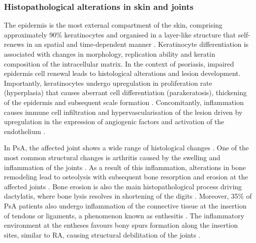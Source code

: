 \subsubsection*{Histopathological alterations in skin and joints}

The epidermis is the most external compartment of the skin, comprising approximately 90\% keratinocytes  and organised in a layer-like structure that self-renews in an  spatial  and  time-dependent  manner \parencite{Wikramanayake2014}. Keratinocyte differentiation is associated with changes in morphology, replication ability and  keratin composition of the intracellular matrix. In the context of psoriasis, impaired epidermis cell renewal leads to histological alterations and lesion development. Importantly, keratinocytes undergo upregulation in proliferation rate (hyperplasia) that causes aberrant cell differentiation (parakeratosis), thickening of the epidermis and subsequent scale formation \parencite{Ruchusatsawat2011}. Concomitantly, inflammation causes immune cell infiltration and hypervascularisation of the lesion driven by upregulation in the expression of angiogenic factors and activation of the endothelium \parencite{Perera2012}.  

In PsA, the affected joint shows a wide range of histological changes \parencite{Haddad2013}. One of the most common structural changes is arthritis caused by the swelling and inflammation of the joints \parencite{Schett2011}. As a result of this inflammation, alterations in bone remodeling lead to osteolysis with subsequent bone resorption and erosion at the affected joints \parencite{Mensah2008}. Bone erosion is also the main histopathological process driving dactylatis, where bone lysis resolves in shortening of the digits \parencite{Gladman2005}. Moreover, 35\% of PsA patients also undergo inflammation of the connective tissue at the insertion of tendons or ligaments, a phenomenon known as enthesitis \parencite{McGonagle2011,Polachek2017}. The inflammatory environment at the entheses favours bony spurs formation along the insertion sites, similar to RA, causing structural debilitation of the joints \parencite{Benjamin2009,Finzel2014}.

 


